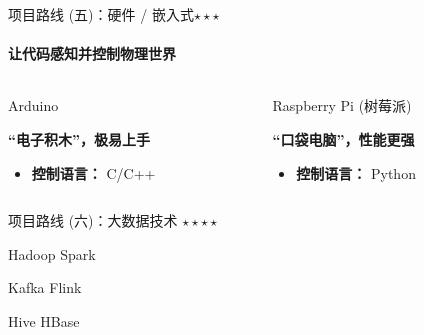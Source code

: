 \documentclass{beamer}
\begin{document}
\begin{frame}{项目路线 (五)：硬件 / 嵌入式$\star \star \star$}
    \framesubtitle{让代码感知并控制物理世界}
    
    \begin{columns}[T]
        \begin{column}{0.5\textwidth}
            \begin{center}
                \huge Arduino
                \vspace{0.3cm}
                
                \large\textbf{“电子积木”，极易上手}
            \end{center}
            \begin{itemize}
                \item \textbf{控制语言：} C/C++

            \end{itemize}
        \end{column}
        
        \begin{column}{0.5\textwidth}
            \begin{center}
                \huge Raspberry Pi
                \large (树莓派)
                \vspace{0.3cm}
                
                \large\textbf{“口袋电脑”，性能更强}
            \end{center}
            \begin{itemize}
                \item \textbf{控制语言：} Python
            \end{itemize}
        \end{column}
    \end{columns}
    

\end{frame}

\begin{frame}{项目路线 (六)：大数据技术 $\star \star \star \star$}
    \vfill %
    
    \begin{center}
        \Huge Hadoop \quad \quad \alert{\Huge Spark}
    \end{center}
    
    \vfill
    
    \begin{center}
        \huge Kafka \quad \quad \alert{\Huge Flink}
    \end{center}
    
    \vfill
    
    \begin{center}
        \huge Hive \quad \quad \huge HBase
    \end{center}
    
    \vfill
\end{frame}
\end{document}

